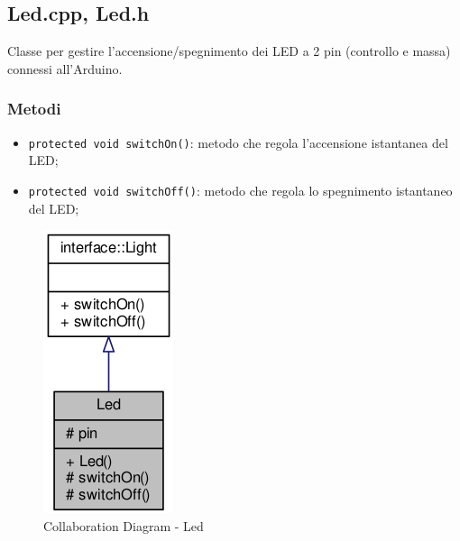 \newpage
\subsection{Led.cpp, Led.h}
Classe per gestire l'accensione/spegnimento dei LED a 2 pin (controllo e massa) connessi all'Arduino.
\subsubsection{Metodi}
\begin{itemize}
	\item \texttt{protected	void switchOn()}: metodo che regola l'accensione istantanea del LED;
	\item \texttt{protected	void switchOff()}: metodo che regola lo spegnimento istantaneo del LED;
\end{itemize}
\begin{figure}[!ht]
	\centering
	\includegraphics[scale=.5]{img/UML/CollaborationDiagram/Led.png}
	\caption{Collaboration Diagram - Led}
\end{figure}
